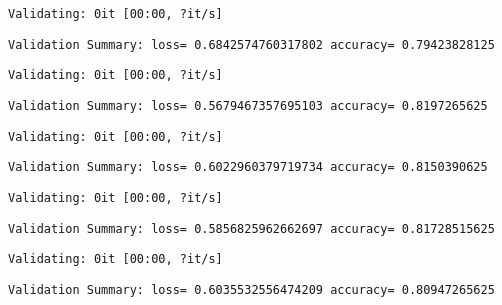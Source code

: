 \documentclass[11pt]{article}
\begin{document}
    
    \begin{Verbatim}[commandchars=\\\{\}]
Validating: 0it [00:00, ?it/s]
    \end{Verbatim}

    
    \begin{Verbatim}[commandchars=\\\{\}]
Validation Summary: loss= 0.6842574760317802 accuracy= 0.79423828125
    \end{Verbatim}

    
    \begin{Verbatim}[commandchars=\\\{\}]
Validating: 0it [00:00, ?it/s]
    \end{Verbatim}

    
    \begin{Verbatim}[commandchars=\\\{\}]
Validation Summary: loss= 0.5679467357695103 accuracy= 0.8197265625
    \end{Verbatim}

    
    \begin{Verbatim}[commandchars=\\\{\}]
Validating: 0it [00:00, ?it/s]
    \end{Verbatim}

    
    \begin{Verbatim}[commandchars=\\\{\}]
Validation Summary: loss= 0.6022960379719734 accuracy= 0.8150390625
    \end{Verbatim}

    
    \begin{Verbatim}[commandchars=\\\{\}]
Validating: 0it [00:00, ?it/s]
    \end{Verbatim}

    
    \begin{Verbatim}[commandchars=\\\{\}]
Validation Summary: loss= 0.5856825962662697 accuracy= 0.81728515625
    \end{Verbatim}

    
    \begin{Verbatim}[commandchars=\\\{\}]
Validating: 0it [00:00, ?it/s]
    \end{Verbatim}

    
    \begin{Verbatim}[commandchars=\\\{\}]
Validation Summary: loss= 0.6035532556474209 accuracy= 0.80947265625
    \end{Verbatim}
\end{document}
